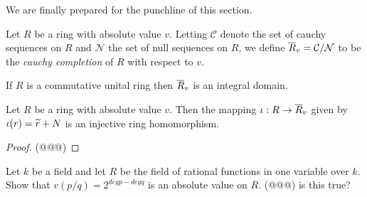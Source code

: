 We are finally prepared for the punchline of this section.

\begin{dfn}
Let \(R\) be a ring with absolute value \(v\).
Letting \(\mathcal{C}\) denote the set of cauchy sequences on \(R\) and \(\mathcal{N}\) the set of null sequences on \(R\), we define \(\overline{R}_{v} = \mathcal{C}/\mathcal{N}\) to be the \emph{cauchy completion} of \(R\) with respect to \(v\).
\end{dfn}

\begin{prop}
\begin{proplist}
\item If \(R\) is a commutative unital ring then \(\overline{R}_{v}\) is an integral domain.
\item Let \(R\) be a ring with absolute value \(v\).
Then the mapping \(\iota : R \rightarrow \overline{R}_{v}\) given by \(\iota(r) = \widetilde{r} + N\) is an injective ring homomorphism.
\end{proplist}
\end{prop}

\begin{proof}
(@@@)
\end{proof}



\Exercises%

\begin{exercise}
Let \(k\) be a field and let \(R\) be the field of rational functions in one variable over \(k\). Show that \(v(p/q) = 2^{deg p - deg q}\) is an absolute value on \(R\). (@@@) is this true?
\end{exercise}
